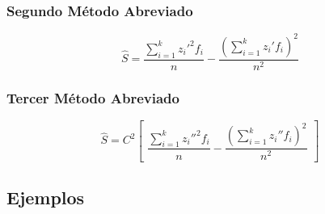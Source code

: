 \subsubsection{Segundo Método Abreviado}
$$\hat{S}=\dfrac{\displaystyle\sum_{i=1}^{k}z_i'^2 f_i }{n}-\dfrac{\left(\displaystyle\sum_{i=1}^{k}z_i' f_i \right)^2}{n^2}$$
\subsubsection{Tercer Método Abreviado}
$$\hat{S}=C^2 
\begin{bmatrix}\dfrac{\displaystyle\sum_{i=1}^{k}z_i''^2 f_i }{n}-\dfrac{\left(\displaystyle\sum_{i=1}^{k}z_i'' f_i \right)^2}{n^2} \end{bmatrix}$$
\subsection{Ejemplos}